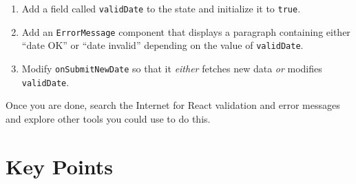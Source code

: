 \begin{enumerate}
\item
  Add a field called \texttt{validDate} to the state and initialize it to \texttt{true}.
\item
  Add an \texttt{ErrorMessage} component that displays a paragraph containing either ``date OK'' or ``date invalid''
  depending on the value of \texttt{validDate}.
\item
  Modify \texttt{onSubmitNewDate} so that it \emph{either} fetches new data \emph{or} modifies \texttt{validDate}.
\end{enumerate}

Once you are done,
search the Internet for React validation and error messages
and explore other tools you could use to do this.

\section*{Key Points}


